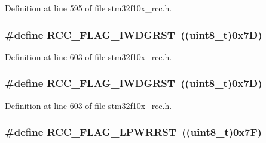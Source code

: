 Definition at line 595 of file stm32f10x\+\_\+rcc.\+h.

\subsubsection[{\texorpdfstring{R\+C\+C\+\_\+\+F\+L\+A\+G\+\_\+\+I\+W\+D\+G\+R\+ST}{RCC_FLAG_IWDGRST}}]{\setlength{\rightskip}{0pt plus 5cm}\#define R\+C\+C\+\_\+\+F\+L\+A\+G\+\_\+\+I\+W\+D\+G\+R\+ST~(({\bf uint8\+\_\+t})0x7\+D)}\hypertarget{group___r_c_c___flag_gaac46bac8a97cf16635ff7ffc1e6c657f}{}\label{group___r_c_c___flag_gaac46bac8a97cf16635ff7ffc1e6c657f}


Definition at line 603 of file stm32f10x\+\_\+rcc.\+h.

\subsubsection[{\texorpdfstring{R\+C\+C\+\_\+\+F\+L\+A\+G\+\_\+\+I\+W\+D\+G\+R\+ST}{RCC_FLAG_IWDGRST}}]{\setlength{\rightskip}{0pt plus 5cm}\#define R\+C\+C\+\_\+\+F\+L\+A\+G\+\_\+\+I\+W\+D\+G\+R\+ST~(({\bf uint8\+\_\+t})0x7\+D)}\hypertarget{group___r_c_c___flag_gaac46bac8a97cf16635ff7ffc1e6c657f}{}\label{group___r_c_c___flag_gaac46bac8a97cf16635ff7ffc1e6c657f}


Definition at line 603 of file stm32f10x\+\_\+rcc.\+h.

\subsubsection[{\texorpdfstring{R\+C\+C\+\_\+\+F\+L\+A\+G\+\_\+\+L\+P\+W\+R\+R\+ST}{RCC_FLAG_LPWRRST}}]{\setlength{\rightskip}{0pt plus 5cm}\#define R\+C\+C\+\_\+\+F\+L\+A\+G\+\_\+\+L\+P\+W\+R\+R\+ST~(({\bf uint8\+\_\+t})0x7\+F)}\hypertarget{group___r_c_c___flag_ga67049531354aed7546971163d02c9920}{}\label{group___r_c_c___flag_ga67049531354aed7546971163d02c9920}


